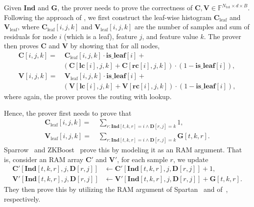 Given $\mathbf{Ind}$ and $\mathbf{G}$,
  the prover needs to prove the correctness of $\mathbf{C}, \mathbf{V}\in \mathbb{F}^{N_{\mathrm{tot}}\times d\times B}$.
  Following the approach of \cite{sparrow24,zkboost26},
  we first construct the leaf-wise histogram $\mathbf{C}_{\mathrm{leaf}}$ and $\mathbf{V}_{\mathrm{leaf}}$,
  where $\mathbf{C}_{\mathrm{leaf}}[i, j, k]$ and $\mathbf{V}_{\mathrm{leaf}}[i, j, k]$ are 
  the number of samples and sum of residuals for node $i$ (which is a leaf), feature $j$, and feature value $k$.
  The prover then proves $\mathbf{C}$ and $\mathbf{V}$ by showing that for all nodes,
  \begin{align}
  \mathbf{C}[i, j, k] =&\ \mathbf{C}_{\mathrm{leaf}}[i, j, k]\cdot \mathbf{is\_leaf}[i] +\nonumber\\
    &(\mathbf{C}[\mathbf{lc}[i], j, k] + \mathbf{C}[\mathbf{rc}[i], j, k])\cdot (1- \mathbf{is\_leaf}[i]),\\
  \mathbf{V}[i, j, k] =&\ \mathbf{V}_{\mathrm{leaf}}[i, j, k]\cdot \mathbf{is\_leaf}[i] +\nonumber\\
    &(\mathbf{V}[\mathbf{lc}[i], j, k] + \mathbf{V}[\mathbf{rc}[i], j, k])\cdot (1- \mathbf{is\_leaf}[i]),
  \end{align}
  where again, the prover proves the routing with lookup.

Hence, the prover first needs to prove that
  \begin{align}
    \mathbf{C}_{\mathrm{leaf}}[i, j, k] =&\ \sum_{r: \mathbf{Ind}[t, k, r]=i \land \mathbf{D}[r, j]=k} 1,\\
    \mathbf{V}_{\mathrm{leaf}}[i, j, k] =&\ \sum_{r: \mathbf{Ind}[t, k, r]=i \land \mathbf{D}[r, j]=k} \mathbf{G}[t, k, r].
  \end{align}
  Sparrow~\cite{sparrow24} and ZKBoost~\cite{zkboost26} prove this by modeling it as an RAM argument.
  That is, consider an RAM array $\mathbf{C}'$ and $\mathbf{V}'$, for each sample $r$, we update
  \[
  \begin{aligned}
    \mathbf{C}'[\mathbf{Ind}[t, k, r], j, \mathbf{D}[r, j]] &\gets \mathbf{C}'[\mathbf{Ind}[t, k, r], j, \mathbf{D}[r, j]] + 1,\\
    \mathbf{V}'[\mathbf{Ind}[t, k, r], j, \mathbf{D}[r, j]] &\gets \mathbf{V}'[\mathbf{Ind}[t, k, r], j, \mathbf{D}[r, j]] + \mathbf{G}[t, k, r].
  \end{aligned}
  \]
  They then prove this by utilizing the RAM argument of Spartan~\cite{spartan20} and of~\cite{twoshuffleRAM24}, respectively.


